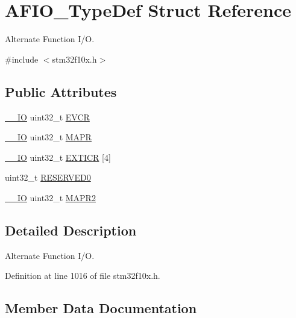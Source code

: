 \hypertarget{struct_a_f_i_o___type_def}{}\section{A\+F\+I\+O\+\_\+\+Type\+Def Struct Reference}
\label{struct_a_f_i_o___type_def}


Alternate Function I/O.  




{\ttfamily \#include $<$stm32f10x.\+h$>$}

\subsection*{Public Attributes}
\begin{DoxyCompactItemize}
\item 
\hyperlink{core__sc300_8h_aec43007d9998a0a0e01faede4133d6be}{\+\_\+\+\_\+\+IO} uint32\+\_\+t \hyperlink{struct_a_f_i_o___type_def_a377d5227cd20950e4489cd04df16500f}{E\+V\+CR}
\item 
\hyperlink{core__sc300_8h_aec43007d9998a0a0e01faede4133d6be}{\+\_\+\+\_\+\+IO} uint32\+\_\+t \hyperlink{struct_a_f_i_o___type_def_a2b44ba1a427df7d8c0b254f869b9b463}{M\+A\+PR}
\item 
\hyperlink{core__sc300_8h_aec43007d9998a0a0e01faede4133d6be}{\+\_\+\+\_\+\+IO} uint32\+\_\+t \hyperlink{struct_a_f_i_o___type_def_a5f590aa12271be60c2f61b0a6d2b8772}{E\+X\+T\+I\+CR} \mbox{[}4\mbox{]}
\item 
uint32\+\_\+t \hyperlink{struct_a_f_i_o___type_def_a6cf52816787797115664f0c8167a92b9}{R\+E\+S\+E\+R\+V\+E\+D0}
\item 
\hyperlink{core__sc300_8h_aec43007d9998a0a0e01faede4133d6be}{\+\_\+\+\_\+\+IO} uint32\+\_\+t \hyperlink{struct_a_f_i_o___type_def_a4420b9fe25158ac2e5e32f6ad9d1b6ca}{M\+A\+P\+R2}
\end{DoxyCompactItemize}


\subsection{Detailed Description}
Alternate Function I/O. 

Definition at line 1016 of file stm32f10x.\+h.



\subsection{Member Data Documentation}
\mbox{\label{struct_a_f_i_o___type_def_a377d5227cd20950e4489cd04df16500f}} 
